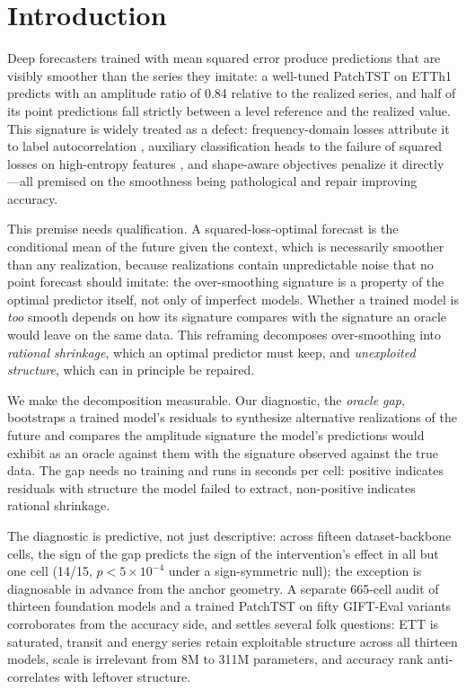 \section{Introduction}

Deep forecasters trained with mean squared error produce predictions that are visibly smoother than the series they imitate: a well-tuned PatchTST on ETTh1 predicts with an amplitude ratio of 0.84 relative to the realized series, and half of its point predictions fall strictly between a level reference and the realized value. This signature is widely treated as a defect: frequency-domain losses attribute it to label autocorrelation \citep{fredf}, auxiliary classification heads to the failure of squared losses on high-entropy features \citep{hcan}, and shape-aware objectives penalize it directly \citep{dilate}---all premised on the smoothness being pathological and repair improving accuracy.

This premise needs qualification. A squared-loss-optimal forecast is the conditional mean of the future given the context, which is necessarily smoother than any realization, because realizations contain unpredictable noise that no point forecast should imitate: the over-smoothing signature is a property of the optimal predictor itself, not only of imperfect models. Whether a trained model is \emph{too} smooth depends on how its signature compares with the signature an oracle would leave on the same data. This reframing decomposes over-smoothing into \emph{rational shrinkage}, which an optimal predictor must keep, and \emph{unexploited structure}, which can in principle be repaired.

We make the decomposition measurable. Our diagnostic, the \emph{oracle gap}, bootstraps a trained model's residuals to synthesize alternative realizations of the future and compares the amplitude signature the model's predictions would exhibit as an oracle against them with the signature observed against the true data. The gap needs no training and runs in seconds per cell: positive indicates residuals with structure the model failed to extract, non-positive indicates rational shrinkage.

The diagnostic is predictive, not just descriptive: across fifteen dataset-backbone cells, the sign of the gap predicts the sign of the intervention's effect in all but one cell (14/15, $p < 5 \times 10^{-4}$ under a sign-symmetric null); the exception is diagnosable in advance from the anchor geometry. A separate 665-cell audit of thirteen foundation models and a trained PatchTST on fifty GIFT-Eval variants \citep{gifteval} corroborates from the accuracy side, and settles several folk questions: ETT is saturated, transit and energy series retain exploitable structure across all thirteen models, scale is irrelevant from 8M to 311M parameters, and accuracy rank anti-correlates with leftover structure.

